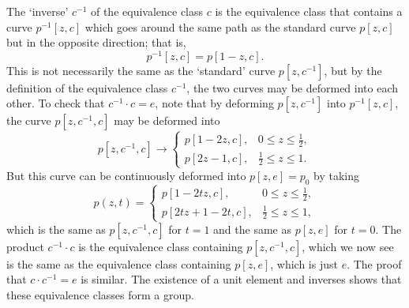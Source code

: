 The `inverse' $c^{-1}$ of the equivalence class $c$ is the equivalence
class that contains a curve $p^{-1}[z,c]$ which goes around the same path
as the standard curve $p[z,c]$ but in the opposite direction; that is,
\[
 p^{-1}[z,c]=p[1-z,c].
\]
This is not necessarily the same as the `standard' curve $p[z,c^{-1}]$,
but by the definition of the equivalence class $c^{-1}$, the two curves
may be deformed into each other. To check that $c^{-1}\cdot c=e$, note
that by deforming $p[z,c^{-1}]$ into $p^{-1}[z,c]$, the curve
$p[z,c^{-1},c]$ may be deformed into
\[
 p[z,c^{-1},c]\longrightarrow
 \begin{cases}
  p[1-2z,c],&0\leq z\leq\tfrac12,\\
  p[2z-1,c],&\tfrac12\leq z\leq1.
 \end{cases}
\]
But this curve can be continuously deformed into $p[z,e]=p_0$ by taking
\[
 p(z,t)=
 \begin{cases}
  p[1-2tz,c],&0\leq z\leq\tfrac12,\\
  p[2tz+1-2t,c],&\tfrac12\leq z\leq1,
 \end{cases}
\]
which is the same as $p[z,c^{-1},c]$ for $t=1$ and the same as $p[z,e]$
for $t=0$. The product $c^{-1}\cdot c$ is the equivalence class containing
$p[z,c^{-1},c]$, which we now see is the same as the equivalence class
containing $p[z,e]$, which is just $e$. The proof that
$c\cdot c^{-1}=e$ is similar. The existence of a unit element and inverses
shows that these equivalence classes form a group.

